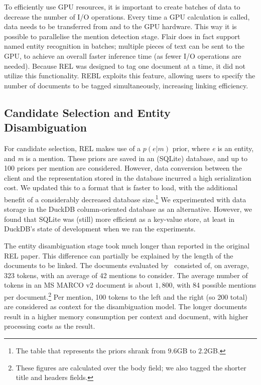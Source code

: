 To efficiently use GPU resources, it is important to create batches of data to decrease the number of I/O operations. Every time a GPU calculation is called, data needs to be transferred from and to the GPU hardware. This way it is possible to parallelise the mention detection stage. 
Flair does in fact support named entity recognition in batches; multiple pieces of text can be sent to the GPU, to achieve an overall faster inference time (as fewer I/O operations are needed). 
Because REL was designed to tag one document at a time, it did not utilize this functionality. REBL exploits this feature, allowing users to specify the number of documents to be tagged simultaneously, increasing linking efficiency. 

\subsection{Candidate Selection and Entity Disambiguation}
For candidate selection, REL makes use of a $p(e|m)$ prior, where \textit{e} is an entity, and \textit{m} is a mention. These priors are saved in an (SQLite) database, and up to 100 priors per mention are considered. However, data conversion between the client and the representation stored in the database incurred a high serialization cost. We updated this to a format that is faster to load, with the additional benefit of a considerably decreased database size.\footnote{The table that represents the priors shrank from $9.6$GB to $2.2$GB.}
We experimented with data storage in the DuckDB column-oriented database as an alternative. However, we found that SQLite was (still) more efficient as a key-value store, at least in DuckDB's state of development when we ran the experiments.

The entity disambiguation stage took much longer than reported in the original REL paper. This difference can partially be explained by the length of the documents to be linked. The documents evaluated by~\citet{rel} consisted of, on average, 323 tokens, with an average of 42 mentions to consider. The average number of tokens in an MS MARCO v2 document is about $1,800$, with 84 possible mentions per document.\footnote{These figures are calculated over the body field; we also tagged the shorter title and headers fields.}
Per mention, 100 tokens to the left and the right (so 200 total) are considered as context for the disambiguation model. 
The longer documents result in a higher memory consumption per context and document, with higher processing costs as the result.

